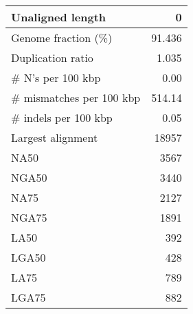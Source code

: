\documentclass[12pt,a4paper]{article}
\begin{document}
\begin{table}[ht]
\begin{center}
\begin{tabular}{|l*{1}{|r}|}
Unaligned length & 0 \\ \hline
Genome fraction (\%) & 91.436 \\ \hline
Duplication ratio & 1.035 \\ \hline
\# N's per 100 kbp & 0.00 \\ \hline
\# mismatches per 100 kbp & 514.14 \\ \hline
\# indels per 100 kbp & 0.05 \\ \hline
Largest alignment & 18957 \\ \hline
NA50 & 3567 \\ \hline
NGA50 & 3440 \\ \hline
NA75 & 2127 \\ \hline
NGA75 & 1891 \\ \hline
LA50 & 392 \\ \hline
LGA50 & 428 \\ \hline
LA75 & 789 \\ \hline
LGA75 & 882 \\ \hline
\end{tabular}
\end{center}
\end{table}
\end{document}
